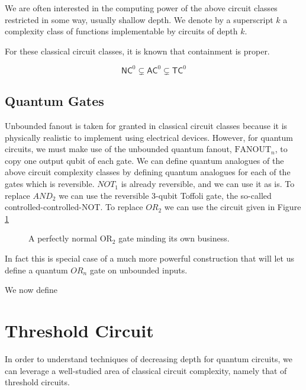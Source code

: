 \begin{equation}
\end{equation}

We are often interested in the computing power of the above
circuit classes restricted in some way, usually shallow depth.
We denote by a superscript $k$ a complexity class of
functions implementable by circuits of depth $k$.

For these classical circuit classes, it is known that containment
is proper.

\begin{equation}
\textsf{NC}^0 \subsetneq \textsf{AC}^0 \subsetneq \textsf{TC}^0
\end{equation}

\subsection{Quantum Gates}

Unbounded fanout is taken for granted in classical circuit classes
because it is physically realistic to implement using electrical
devices. However, for quantum circuits, we must make use of the
unbounded quantum fanout, $\text{FANOUT}_n$, to copy one output
qubit of each gate.
We can define quantum analogues of the above circuit complexity 
classes by defining quantum analogues for each of the gates which
is reversible.
$NOT_1$ is already reversible, and we can use it as is.
To replace $AND_2$ we can use the reversible $3$-qubit Toffoli gate,
the so-called controlled-controlled-NOT.
To replace $OR_2$ we can use the circuit given in
Figure \ref{fig:or2}

\begin{figure}
\caption{A perfectly normal $\text{OR}_2$ gate minding its own business.}
\label{fig:or2}
\end{figure}

In fact this is special case of a much more powerful construction
that will let us define a quantum $OR_n$ gate on unbounded inputs.



We now define 

\section{Threshold Circuit}

In order to understand techniques of decreasing depth for quantum 
circuits, we can leverage a well-studied area of classical circuit
complexity, namely that of threshold circuits.

